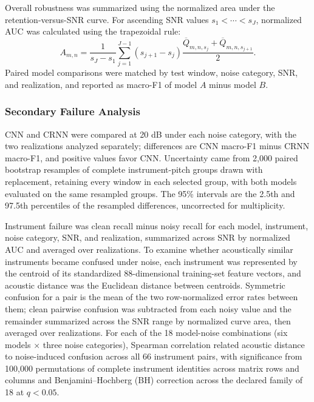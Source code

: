\documentclass[conference]{IEEEtran}
\begin{document}
Overall robustness was summarized using the normalized area under the retention-versus-SNR curve. For ascending SNR values $s_1<\cdots<s_J$, normalized AUC was calculated using the trapezoidal rule:
\begin{equation}
A_{m,n}
=
\frac{1}{s_J-s_1}
\sum_{j=1}^{J-1}
\left(s_{j+1}-s_j\right)
\frac{
\overline{Q}_{m,n,s_j}
+
\overline{Q}_{m,n,s_{j+1}}
}{2}.
\label{eq:retention_auc}
\end{equation}
Paired model comparisons were matched by test window, noise category, SNR, and realization, and reported as macro-F1 of model $A$ minus model $B$.


\subsubsection{Secondary Failure Analysis}

CNN and CRNN were compared at 20 dB under each noise category, with the two realizations analyzed separately; differences are CNN macro-F1 minus CRNN macro-F1, and positive values favor CNN. Uncertainty came from 2,000 paired bootstrap resamples of complete instrument-pitch groups drawn with replacement, retaining every window in each selected group, with both models evaluated on the same resampled groups. The 95\% intervals are the 2.5th and 97.5th percentiles of the resampled differences, uncorrected for multiplicity.

Instrument failure was clean recall minus noisy recall for each model, instrument, noise category, SNR, and realization, summarized across SNR by normalized AUC and averaged over realizations. To examine whether acoustically similar instruments became confused under noise, each instrument was represented by the centroid of its standardized 88-dimensional training-set feature vectors, and acoustic distance was the Euclidean distance between centroids. Symmetric confusion for a pair is the mean of the two row-normalized error rates between them; clean pairwise confusion was subtracted from each noisy value and the remainder summarized across the SNR range by normalized curve area, then averaged over realizations. For each of the 18 model-noise combinations (six models $\times$ three noise categories), Spearman correlation related acoustic distance to noise-induced confusion across all 66 instrument pairs, with significance from 100,000 permutations of complete instrument identities across matrix rows and columns and Benjamini--Hochberg (BH) correction across the declared family of 18 at $q<0.05$.
\end{document}
